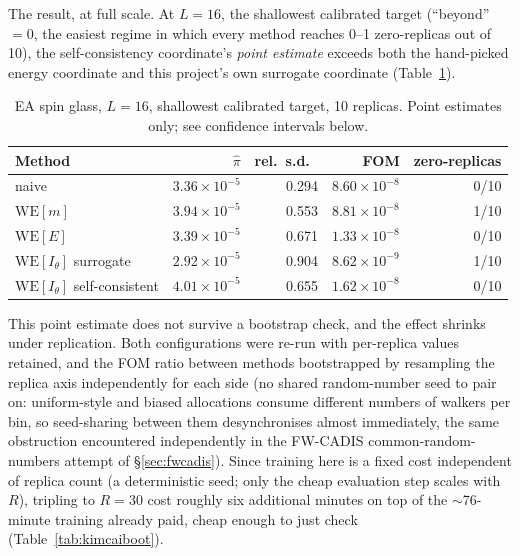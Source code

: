 \documentclass[a4paper,fleqn]{cas-sc}
\begin{document}
The result, at full scale. At $L=16$, the shallowest calibrated target (``beyond''\,$=0$,
the easiest regime in which every method reaches 0--1 zero-replicas out of 10), the
self-consistency coordinate's \emph{point estimate} exceeds both the hand-picked energy
coordinate and this project's own surrogate coordinate (Table~\ref{tab:kimcai}).

\begin{table}[H]
\centering\small
\caption{EA spin glass, $L=16$, shallowest calibrated target, 10 replicas. Point estimates
	only; see confidence intervals below.}
\label{tab:kimcai}
\begin{tabular}{lrrrr}
	\toprule
	Method & $\hat\pi$ & rel.\ s.d.\ & FOM & zero-replicas \\
	\midrule
	naive & $3.36\times10^{-5}$ & 0.294 & $8.60\times10^{-8}$ & 0/10 \\
	$\mathrm{WE}[m]$ & $3.94\times10^{-5}$ & 0.553 & $8.81\times10^{-8}$ & 1/10 \\
	$\mathrm{WE}[E]$ & $3.39\times10^{-5}$ & 0.671 & $1.33\times10^{-8}$ & 0/10 \\
	$\mathrm{WE}[I_\theta]$ surrogate & $2.92\times10^{-5}$ & 0.904 & $8.62\times10^{-9}$ & 1/10 \\
	$\mathrm{WE}[I_\theta]$ self-consistent & $4.01\times10^{-5}$ & 0.655 &
	$1.62\times10^{-8}$ & 0/10 \\
	\bottomrule
\end{tabular}
\end{table}

This point estimate does not survive a bootstrap check, and the effect shrinks
	under replication. Both configurations were re-run with per-replica values retained, and
the FOM ratio between methods bootstrapped by resampling the replica axis independently for
each side (no shared random-number seed to pair on: uniform-style and biased allocations
consume different numbers of walkers per bin, so seed-sharing between them desynchronises
almost immediately, the same obstruction encountered independently in the FW-CADIS
common-random-numbers attempt of \S\ref{sec:fwcadis}). Since training here is a fixed cost
independent of replica count (a deterministic seed; only the cheap evaluation step scales
with $R$), tripling to $R=30$ cost roughly six additional minutes on top of the
$\sim$76-minute training already paid, cheap enough to just check
(Table~\ref{tab:kimcaiboot}).
\end{document}
